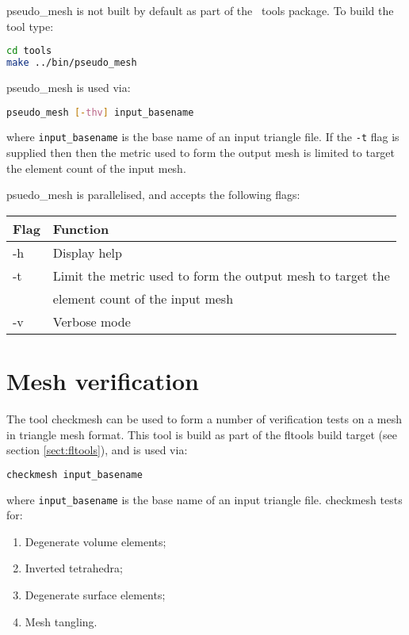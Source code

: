 pseudo\_mesh is not built by default as part of the \fluidity\ tools package. To
build the tool type:

\begin{lstlisting}[language = Bash]
cd tools
make ../bin/pseudo_mesh
\end{lstlisting}

pseudo\_mesh is used via:

\begin{lstlisting}[language = Bash]
pseudo_mesh [-thv] input_basename
\end{lstlisting}

where \lstinline[language = Bash]*input_basename* is the base name of an input
triangle file. If the \lstinline[language = Bash]*-t* flag is supplied then
then the metric used to form the output mesh is limited to target the element
count of the input mesh.

psuedo\_mesh is parallelised, and accepts the following flags:

\begin{center}
  \begin{tabular}{| l | l |}
    \hline
    Flag & Function \\
    \hline
    -h   & Display help \\
    -t   & Limit the metric used to form the output mesh to target the \\
         & element count of the input mesh \\
    -v   & Verbose mode \\
    \hline
  \end{tabular}
\end{center}

\section{Mesh verification}

The tool checkmesh can be used to form a number of verification tests on a mesh
in triangle mesh format. This tool is build as part of the fltools build target
(see section \ref{sect:fltools}), and is used via:

\begin{lstlisting}[language = Bash]
checkmesh input_basename
\end{lstlisting}

where \lstinline[language = Bash]*input_basename* is the base name of an input
triangle file. checkmesh tests for:

\begin{enumerate}
  \item Degenerate volume elements;
  \item Inverted tetrahedra;
  \item Degenerate surface elements;
  \item\label{item:mesh_tangling} Mesh tangling.
\end{enumerate}

